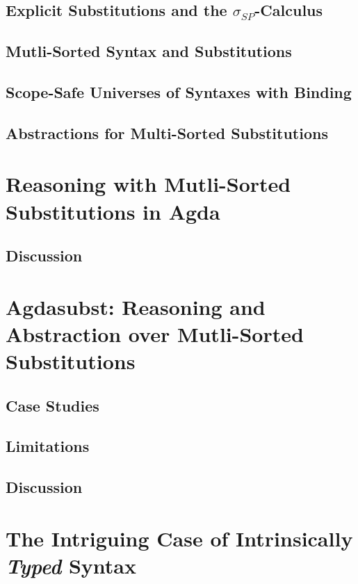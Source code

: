 \documentclass[screen,nonacm]{acmart}
\begin{document}
\subsection{Explicit Substitutions and the $\sigma_{SP}$-Calculus}

\subsection{Mutli-Sorted Syntax and Substitutions}

\subsection*{Scope-Safe Universes of Syntaxes with Binding}

\subsection*{Abstractions for Multi-Sorted Substitutions}

\section{Reasoning with Mutli-Sorted Substitutions in Agda}\label{sec:multi}

\subsection{Discussion}\label{sec:discussion-1}

\section{Agdasubst: Reasoning and Abstraction over Mutli-Sorted Substitutions}\label{sec:agdasubst}

\subsection{Case Studies}

\subsection{Limitations}\label{sec:limitations}

\subsection{Discussion}\label{sec:discussion-2}

\section{The Intriguing Case of Intrinsically \emph{Typed} Syntax}\label{sec:intrinsic}
\end{document}
